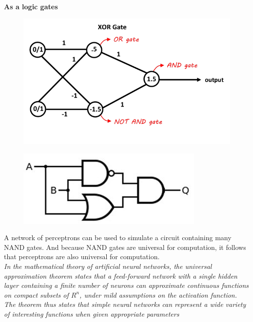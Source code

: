 \documentclass[10pt, compress]{beamer}
\begin{document}
\begin{frame}
  \textbf{As a logic gates}

  \begin{multicols}{2}
    \begin{figure}
      \includegraphics[width=1.2\linewidth]{imgs/mlp_2}
    \end{figure}

    \columnbreak

    \hfill \break
    \begin{figure}
      \includegraphics[width=.7\linewidth]{imgs/xor_nand_or}
    \end{figure}
  \end{multicols}
\end{frame}

\begin{frame}
   A network of perceptrons can be used to simulate a circuit containing many NAND gates. And because NAND gates are universal for computation, it follows that perceptrons are also universal for computation. \\ \hfill \break
  \textit{In the mathematical theory of artificial neural networks, the universal approximation theorem states that a feed-forward network with a single hidden layer containing a finite number of neurons can approximate continuous functions on compact subsets of $R^n$, under mild assumptions on the activation function. The theorem thus states that simple neural networks can represent a wide variety of interesting functions when given appropriate parameters}
\end{frame}
\end{document}
